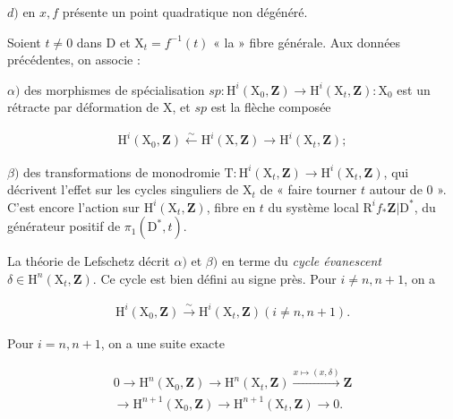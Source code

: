 \documentclass[10pt,leqno]{article}
\begin{document}
\noindent \(d)\) en \(x, f\) présente un point quadratique non dégénéré.\par

\noindent Soient \(t\ne 0\) dans \(\mathrm{D}\) et \(\mathrm{X}_{t}=f^{- 1}(t)\) « la » fibre générale. Aux données précédentes, on associe :\par

\noindent \(\alpha )\) des morphismes de spécialisation \(\mathit{sp} : \mathrm{H}^{i}(\mathrm{X}_{0},\mathbf{Z})\longrightarrow \mathrm{H}^{i}(\mathrm{X}_{t},\mathbf{Z}) : \mathrm{X}_{0}\) est un rétracte par déformation de \(\mathrm{X}\), et \(\mathit{sp}\) est la flèche composée\par

\begin{equation*}\begin{gathered}\mathrm{H}^{i}(\mathrm{X}_{0},\mathbf{Z}) \xleftarrow{\sim } \mathrm{H}^{i}(\mathrm{X},\mathbf{Z}) \longrightarrow  \mathrm{H}^{i}(\mathrm{X}_{t},\mathbf{Z});\end{gathered}\end{equation*}

\noindent \(\beta )\) des transformations de monodromie \(\mathrm{T} : \mathrm{H}^{i}(\mathrm{X}_{t},\mathbf{Z})\longrightarrow \mathrm{H}^{i}(\mathrm{X}_{t},\mathbf{Z})\), qui décrivent l’effet sur les cycles singuliers de \(\mathrm{X}_{t}\) de « faire tourner \(t\) autour de 0 ». C’est encore l’action sur \(\mathrm{H}^{i}(\mathrm{X}_{t},\mathbf{Z})\), fibre en \(t\) du système local \(\mathrm{R}^{i} f_{*}\mathbf{Z}|\mathrm{D}^{*}\), du générateur positif de \(\pi _{1}(\mathrm{D}^{*},t)\).\par

\noindent La théorie de Lefschetz décrit \(\alpha )\) et \(\beta )\) en terme du \emph{cycle évanescent} \(\delta \in \mathrm{H}^{n}(\mathrm{X}_{t},\mathbf{Z})\). Ce cycle est bien défini au signe près. Pour \(i\ne n,n+1\), on a\par

\begin{equation*}\begin{gathered}\mathrm{H}^{i}(\mathrm{X}_{0},\mathbf{Z}) \xrightarrow{\sim } \mathrm{H}^{i}(\mathrm{X}_{t},\mathbf{Z})    (i\ne n,n+1).\end{gathered}\end{equation*}

\noindent Pour \(i=n,n+1\), on a une suite exacte\par

\begin{equation*}\begin{gathered}0 \longrightarrow  \mathrm{H}^{n}(\mathrm{X}_{0},\mathbf{Z}) \longrightarrow  \mathrm{H}^{n}(\mathrm{X}_{t},\mathbf{Z}) \xrightarrow{x\longmapsto (x,\delta )} \mathbf{Z} \\ \longrightarrow  \mathrm{H}^{n+1}(\mathrm{X}_{0},\mathbf{Z}) \longrightarrow  \mathrm{H}^{n+1}(\mathrm{X}_{t},\mathbf{Z}) \longrightarrow  0.\end{gathered}\end{equation*}
\end{document}
